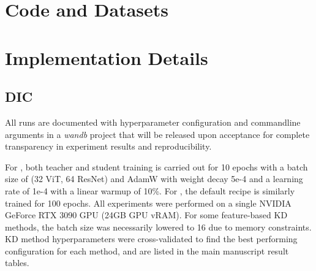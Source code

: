 \clearpage
\setcounter{page}{1}


\appendix


\renewcommand{\thesection}{\Alph{section}}
\renewcommand{\thesubsection}{\Alph{section}.\arabic{subsection}}

\section{Code and Datasets}\label{supp:code_and_datasets}



\section{Implementation Details}\label{supp:implementation_details}

\subsection{DIC}

All runs are documented with hyperparameter configuration and commandline arguments in a \textit{wandb} project that will be released upon acceptance for complete transparency in experiment results and reproducibility. %

For \rvl{}, both teacher and student training is carried out for 10 epochs with a batch size of (32 ViT, 64 ResNet) and AdamW with weight decay 5e-4 and a learning rate of 1e-4 with a linear warmup of 10\%.
For \tobacco{}, the default recipe is similarly trained for 100 epochs. All experiments were performed on a single NVIDIA GeForce RTX 3090 GPU (24GB GPU vRAM).
For some feature-based KD methods, the batch size was necessarily lowered to 16 due to memory constraints.
KD method hyperparameters were cross-validated to find the best performing configuration for each method, and are listed in the main manuscript result tables.

